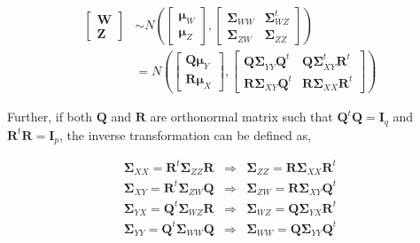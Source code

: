 \documentclass[12pt,A4paper,authoryear]{elsarticle} %
\begin{document}
\begin{align}
  \begin{bmatrix}\mathbf{W} \\ 
  \boldsymbol{Z}\end{bmatrix}  & \sim N \left(
    \begin{bmatrix}
      \boldsymbol{\mu}_W \\ \boldsymbol{\mu}_Z
    \end{bmatrix},
    \begin{bmatrix}
      \boldsymbol{\Sigma}_{WW} & \boldsymbol{\Sigma}_{WZ}^t \\
      \boldsymbol{\Sigma}_{ZW} & \boldsymbol{\Sigma}_{ZZ}
    \end{bmatrix} \right) \nonumber \\
  & = N \left(
    \begin{bmatrix}
      \boldsymbol{Q\mu}_Y \\
      \boldsymbol{R\mu}_X
    \end{bmatrix},
    \begin{bmatrix}
      \boldsymbol{Q\Sigma}_{YY}\boldsymbol{Q}^t & \boldsymbol{Q\Sigma}_{XY}^t\mathbf{R}^t \\
      \boldsymbol{R\Sigma}_{XY}\boldsymbol{Q}^t & \boldsymbol{R\Sigma}_{XX}\mathbf{R}^t
    \end{bmatrix}
  \right)
  \label{eq:model3}
\end{align}

Further, if both \(\mathbf{Q}\) and \(\mathbf{R}\) are orthonormal
matrix such that \(\mathbf{Q}^t\mathbf{Q} = \mathbf{I}_q\) and
\(\mathbf{R}^t\mathbf{R} = \mathbf{I}_p\), the inverse transformation
can be defined as,

\begin{equation}
  \begin{matrix}
    \boldsymbol{\Sigma}_{XX} = \mathbf{R}^t \boldsymbol{\Sigma}_{ZZ} \mathbf{R} & \Rightarrow & \boldsymbol{\Sigma}_{ZZ} = \mathbf{R} \boldsymbol{\Sigma}_{XX} \mathbf{R}^t \\
    \boldsymbol{\Sigma}_{XY} = \mathbf{R}^t \boldsymbol{\Sigma}_{ZW} \mathbf{Q} & \Rightarrow & \boldsymbol{\Sigma}_{ZW} = \mathbf{R} \boldsymbol{\Sigma}_{XY} \mathbf{Q}^t \\
    \boldsymbol{\Sigma}_{YX} = \mathbf{Q}^t \boldsymbol{\Sigma}_{WZ} \mathbf{R} & \Rightarrow & \boldsymbol{\Sigma}_{WZ} = \mathbf{Q} \boldsymbol{\Sigma}_{YX} \mathbf{R}^t \\
    \boldsymbol{\Sigma}_{YY} = \mathbf{Q}^t \boldsymbol{\Sigma}_{WW} \mathbf{Q} & \Rightarrow & \boldsymbol{\Sigma}_{WW} = \mathbf{Q} \boldsymbol{\Sigma}_{YY} \mathbf{Q}^t
  \end{matrix}
  \label{eq:cov-yx-wz}
\end{equation}
\end{document}
